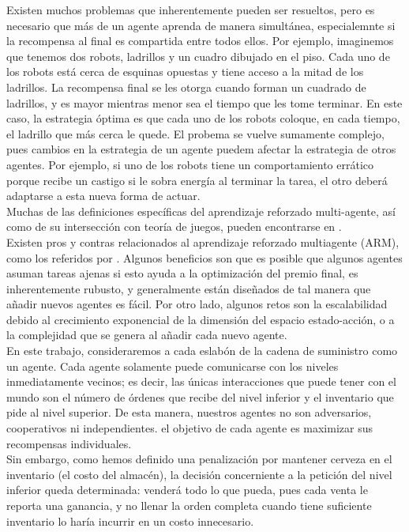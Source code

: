 Existen muchos problemas que inherentemente pueden ser resueltos, pero es necesario que m\'as de un agente aprenda de manera simult\'anea, especialemnte si la recompensa al final es compartida entre todos ellos. Por ejemplo, imaginemos que tenemos dos robots, ladrillos y un cuadro dibujado en el piso. Cada uno de los robots est\'a cerca de esquinas opuestas y tiene acceso a la mitad de los ladrillos. La recompensa final se les otorga cuando forman un cuadrado de ladrillos, y es mayor mientras menor sea el tiempo que les tome terminar. En este caso, la estrategia \'optima es que cada uno de los robots coloque, en cada tiempo, el ladrillo que m\'as cerca le quede. El probema se vuelve sumamente complejo, pues cambios en la estrategia de un agente puedem afectar la estrategia de otros agentes. Por ejemplo, si uno de los robots tiene un comportamiento err\'atico porque recibe un castigo si le sobra energ\'ia al terminar la tarea, el otro deber\'a adaptarse a esta nueva forma de actuar.\\

Muchas de las definiciones espec\'ificas del aprendizaje reforzado multi-agente, as\'i como de su intersecci\'on con teor\'ia de juegos, pueden encontrarse en \citet{Bloembergen}. \\

Existen pros y contras relacionados al aprendizaje reforzado multiagente (ARM), como los referidos por \citet{Busoniu}. Algunos beneficios son que es posible que algunos agentes asuman tareas ajenas si esto ayuda a la optimizaci\'on del premio final, es inherentemente rubusto, y generalmente est\'an dise\~nados de tal manera que a\~nadir nuevos agentes es f\'acil. Por otro lado, algunos retos son la escalabilidad debido al crecimiento exponencial de la dimensi\'on del espacio estado-acci\'on, o a la complejidad que se genera al a\~nadir cada nuevo agente.\\

En este trabajo, consideraremos a cada eslab\'on de la cadena de suministro como un agente. Cada agente solamente puede comunicarse con los niveles inmediatamente vecinos; es decir, las \'unicas interacciones que puede tener con el mundo son el n\'umero de \'ordenes que recibe del nivel inferior y el inventario que pide al nivel superior. De esta manera, nuestros agentes no son adversarios, cooperativos ni independientes. el objetivo de cada agente es maximizar sus recompensas individuales.\\

Sin embargo, como hemos definido una penalizaci\'on por mantener cerveza en el inventario (el costo del almac\'en), la decisi\'on concerniente a la petici\'on del nivel inferior queda determinada: vender\'a todo lo que pueda, pues cada venta le reporta una ganancia, y no llenar la orden completa cuando tiene suficiente inventario lo har\'ia incurrir en un costo innecesario.\\

